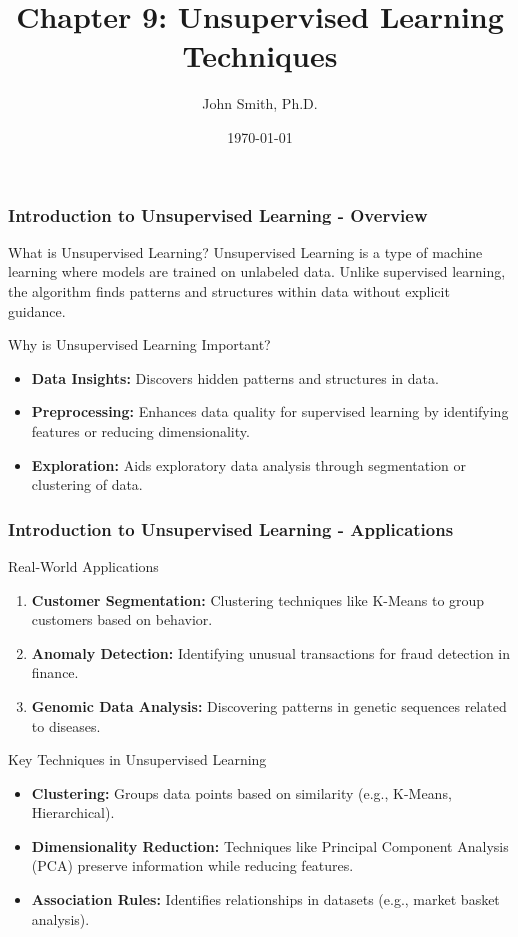 \documentclass[aspectratio=169]{beamer}
\title[Unsupervised Learning Techniques]{Chapter 9: Unsupervised Learning Techniques}
\author[J. Smith]{John Smith, Ph.D.}
\institute[University Name]{
  Department of Computer Science\\
  University Name\\
  \vspace{0.3cm}
  Email: email@university.edu\\
  Website: www.university.edu
}
\date{\today}
\begin{document}
\frame{\titlepage}

\begin{frame}[fragile]
    \frametitle{Introduction to Unsupervised Learning - Overview}
    
    \begin{block}{What is Unsupervised Learning?}
        Unsupervised Learning is a type of machine learning where models are trained on unlabeled data. Unlike supervised learning, the algorithm finds patterns and structures within data without explicit guidance.
    \end{block}
    
    \begin{block}{Why is Unsupervised Learning Important?}
        \begin{itemize}
            \item \textbf{Data Insights:} Discovers hidden patterns and structures in data.
            \item \textbf{Preprocessing:} Enhances data quality for supervised learning by identifying features or reducing dimensionality.
            \item \textbf{Exploration:} Aids exploratory data analysis through segmentation or clustering of data.
        \end{itemize}
    \end{block}
\end{frame}

\begin{frame}[fragile]
    \frametitle{Introduction to Unsupervised Learning - Applications}
    
    \begin{block}{Real-World Applications}
        \begin{enumerate}
            \item \textbf{Customer Segmentation:} Clustering techniques like K-Means to group customers based on behavior.
            \item \textbf{Anomaly Detection:} Identifying unusual transactions for fraud detection in finance.
            \item \textbf{Genomic Data Analysis:} Discovering patterns in genetic sequences related to diseases.
        \end{enumerate}
    \end{block}
    
    \begin{block}{Key Techniques in Unsupervised Learning}
        \begin{itemize}
            \item \textbf{Clustering:} Groups data points based on similarity (e.g., K-Means, Hierarchical).
            \item \textbf{Dimensionality Reduction:} Techniques like Principal Component Analysis (PCA) preserve information while reducing features.
            \item \textbf{Association Rules:} Identifies relationships in datasets (e.g., market basket analysis).
        \end{itemize}
    \end{block}
\end{frame}
\end{document}
